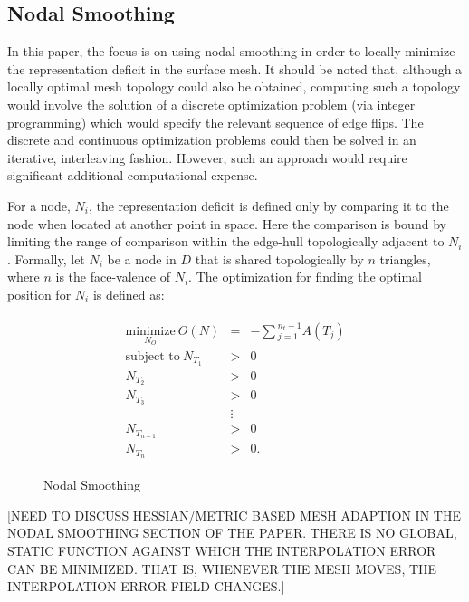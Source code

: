
\subsection{Nodal Smoothing}
In this paper, the focus is on using nodal smoothing in 
order to locally minimize the representation deficit in the surface mesh.  
It should be noted that, although a locally optimal mesh topology could 
also be obtained, computing such a topology would involve the solution of 
a discrete optimization problem (via integer programming) which would 
specify the relevant sequence of edge flips.  The discrete 
and continuous optimization problems could then be solved in an iterative, 
interleaving fashion.  However, such an approach would require significant 
additional computational expense.

For a node, $N_i$, the representation deficit is defined only by
comparing it to the node when located at another point in space. Here
the comparison is bound by limiting the range of comparison within the
edge-hull topologically adjacent to $N_i$. Formally, let $N_i$ be a node
in $D$ that is shared topologically by $n$ triangles, where $n$ is the
face-valence of $N_i$. The optimization for finding the optimal position
for $N_i$ is defined as:

\begin{eqnarray*}
\begin{array}{rcl}
\underset{N_O}{\text{minimize}} \ O(N) & = &
-\sum{_{j=1}^{n_t-1}A\left(T_j\right)} \\
\text{subject to} \ N_{T_1} & > & 0 \\
N_{T_2} & > & 0 \\ 
N_{T_3} & > & 0 \\
& \vdots & \\
N_{T_{n-1}} & > & 0 \\ 
N_{T_n} & > & 0.
\end{array}
\end{eqnarray*}

\begin{figure}[h!]
  \caption{Nodal Smoothing}
\end{figure}

[NEED TO DISCUSS HESSIAN/METRIC BASED MESH ADAPTION IN THE NODAL
SMOOTHING SECTION OF THE PAPER. THERE IS NO GLOBAL, STATIC FUNCTION
AGAINST WHICH THE INTERPOLATION ERROR CAN BE MINIMIZED. THAT IS,
WHENEVER THE MESH MOVES, THE INTERPOLATION ERROR FIELD CHANGES.]

